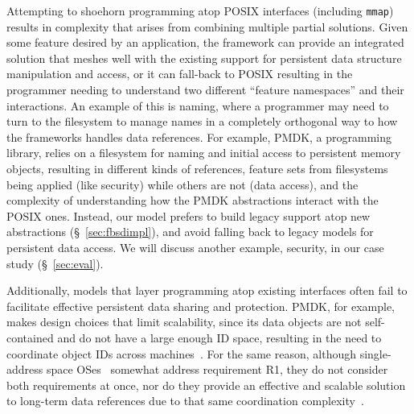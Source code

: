 {    Attempting to shoehorn \NVM programming atop POSIX interfaces (including \texttt{mmap}) results in
    complexity that arises from combining multiple partial solutions. Given some feature desired by an
    application, the \NVM framework can provide an integrated solution that meshes
    well with the existing support for persistent data structure manipulation and access, or it can
    fall-back to POSIX resulting in the programmer needing to understand two different ``feature
    namespaces'' and their interactions. An example of this is naming, where a programmer may need
    to turn to the filesystem to manage names in a completely orthogonal way to how the \NVM frameworks handles
    data references. For example, PMDK, a \NVM programming library, relies on a filesystem for naming and initial access to
    persistent memory objects, resulting in different kinds of references, feature sets from filesystems
    being applied (like security) while others are not (data access), and the complexity of
    understanding how the PMDK abstractions interact with the POSIX ones. Instead, our model prefers to
    build legacy support atop new abstractions (\S~\ref{sec:fbsdimpl}), and avoid falling back to legacy
    models for persistent data access. We will discuss another example,
    security, in our case study (\S~\ref{sec:eval}).


    Additionally, models that layer \NVM programming atop existing interfaces often fail to facilitate effective persistent data sharing and
    protection.  PMDK, for example, makes design choices that limit
    scalability, since its
    data objects are not self-contained and do not have a large enough ID space, resulting
    in the need to coordinate object IDs across machines~\cite{bittman:plos19}. For the same reason,
    although single-address space OSes~\cite{chase:tocs94} somewhat address requirement R1, they do
    not consider both requirements at once, nor do they provide an effective and scalable solution to
    long-term data references due to that same coordination complexity~\cite{bittman:hotstorage19}.


}


